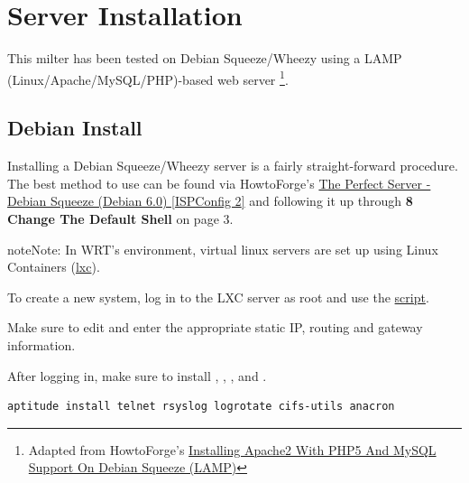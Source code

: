 \documentclass[letterpaper,10pt,english]{sphinxmanual}
\begin{document}
\begin{center}\setlength{\fboxsep}{5pt}\end{center}


\section{Server Installation}
\label{installation:server-installation}
This milter has been tested on Debian Squeeze/Wheezy using a LAMP
(Linux/Apache/MySQL/PHP)-based web server \footnote{
Adapted from HowtoForge's \href{http://www.howtoforge.com/installing-apache2-with-php5-and-mysql-support-on-debian-squeeze-lamp}{Installing Apache2 With PHP5 And MySQL Support On Debian Squeeze (LAMP)}
}.


\subsection{Debian Install}
\label{installation:debian-install}
Installing a Debian Squeeze/Wheezy server is a fairly straight-forward
procedure.  The best method to use can be found via HowtoForge's
\href{http://www.howtoforge.com/perfect-server-debian-squeeze-ispconfig-2}{The Perfect Server - Debian Squeeze (Debian 6.0) {[}ISPConfig 2{]}} and following
it up through \textbf{8 Change The Default Shell} on page 3.

\begin{notice}{note}{Note:}
In WRT's environment, virtual linux servers are set up using Linux Containers (\href{http://lxc.sourceforge.net/}{lxc}).

To create a new system, log in to the LXC server as root and use the   \href{http://www.google.com/url?sa=t\&rct=j\&q=\&esrc=s\&source=web\&cd=1\&ved=0CCAQFjAA\&url=http://mindref.blogspot.com/2011/01/debian-lxc-create.html\&ei=Gxk-UO7IMIH86wGEoIGgDg\&usg=AFQjCNH8nf1DFSRpLmQigOgj8AsU-xhA3Q\&sig2=KpSOTudr5eTp97MCE7aLRw}{script}.

Make sure to edit  and enter the appropriate
static IP, routing and gateway information.
\end{notice}

After logging in, make sure to install , , ,
 and .

\begin{Verbatim}[commandchars=\\\{\},formatcom=\footnotesize]
aptitude install telnet rsyslog logrotate cifs-utils anacron
\end{Verbatim}
\end{document}
